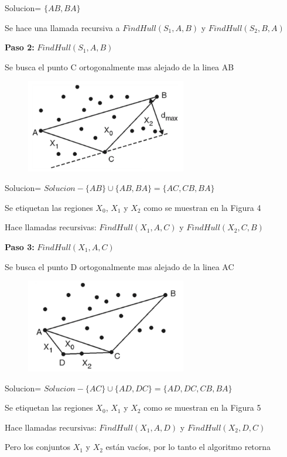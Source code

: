 \begin{enumerate}[a)]
Solucion= $\{AB,BA\}$

Se hace una llamada recursiva a $FindHull(S_1, A, B)$ y $FindHull(S_2, B, A)$

\textbf{Paso 2: }$FindHull(S_1, A, B)$

Se busca el punto C ortogonalmente mas alejado de la linea AB

\begin{figure}[!htb]
  \centering
  \includegraphics[width=7cm, scale=1]{Images/Punto3/ej3.png}
  \caption{}
\end{figure}

Solucion= $Solucion - \{AB\} \cup \{AB,BA\} = \{AC, CB, BA\}$

Se etiquetan las regiones $X_0$, $X_1$ y $X_2$ como se muestran en la Figura 4

Hace llamadas recursivas: $FindHull(X_1, A, C)$ y $FindHull(X_2, C, B)$

\textbf{Paso 3: }$FindHull(X_1, A, C)$

Se busca el punto D ortogonalmente mas alejado de la linea AC

\begin{figure}[!htb]
  \centering
  \includegraphics[width=7cm, scale=1]{Images/Punto3/ej4.png}
  \caption{}
\end{figure}

Solucion= $Solucion - \{AC\} \cup \{AD,DC\} = \{AD, DC, CB, BA\}$

Se etiquetan las regiones $X_0$, $X_1$ y $X_2$ como se muestran en la Figura 5

Hace llamadas recursivas: $FindHull(X_1, A, D)$ y $FindHull(X_2, D, C)$

Pero los conjuntos $X_1$ y $X_2$ están vacíos, por lo tanto el algoritmo retorna


\end{enumerate}
